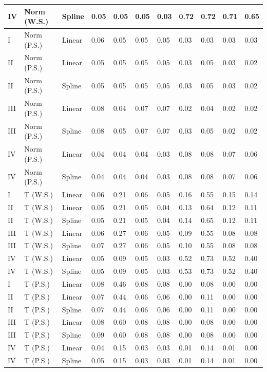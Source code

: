 \documentclass{article}\usepackage[]{graphicx}\usepackage[]{color}
\begin{document}
\begin{table}[ht]
\begin{tabular}{lll|llll|llll}
  IV & Norm (W.S.) & Spline & 0.05 & 0.05 & 0.05 & 0.03 & 0.72 & 0.72 & 0.71 & 0.65 \\ 
   \hline
I & Norm (P.S.) & Linear & 0.06 & 0.05 & 0.05 & 0.05 & 0.03 & 0.03 & 0.03 & 0.03 \\ 
  II & Norm (P.S.) & Linear & 0.05 & 0.05 & 0.05 & 0.05 & 0.03 & 0.05 & 0.03 & 0.02 \\ 
  II & Norm (P.S.) & Spline & 0.05 & 0.05 & 0.05 & 0.05 & 0.03 & 0.05 & 0.03 & 0.02 \\ 
  III & Norm (P.S.) & Linear & 0.08 & 0.04 & 0.07 & 0.07 & 0.02 & 0.04 & 0.02 & 0.02 \\ 
  III & Norm (P.S.) & Spline & 0.08 & 0.05 & 0.07 & 0.07 & 0.03 & 0.05 & 0.02 & 0.02 \\ 
  IV & Norm (P.S.) & Linear & 0.04 & 0.04 & 0.04 & 0.03 & 0.08 & 0.08 & 0.07 & 0.06 \\ 
  IV & Norm (P.S.) & Spline & 0.04 & 0.04 & 0.04 & 0.03 & 0.08 & 0.08 & 0.07 & 0.06 \\ 
   \hline
I & T (W.S.) & Linear & 0.06 & 0.21 & 0.06 & 0.05 & 0.16 & 0.55 & 0.15 & 0.14 \\ 
  II & T (W.S.) & Linear & 0.05 & 0.21 & 0.05 & 0.04 & 0.13 & 0.64 & 0.12 & 0.11 \\ 
  II & T (W.S.) & Spline & 0.05 & 0.21 & 0.05 & 0.04 & 0.14 & 0.65 & 0.12 & 0.11 \\ 
  III & T (W.S.) & Linear & 0.06 & 0.27 & 0.06 & 0.05 & 0.09 & 0.55 & 0.08 & 0.08 \\ 
  III & T (W.S.) & Spline & 0.07 & 0.27 & 0.06 & 0.05 & 0.10 & 0.55 & 0.08 & 0.08 \\ 
  IV & T (W.S.) & Linear & 0.05 & 0.09 & 0.05 & 0.03 & 0.52 & 0.73 & 0.52 & 0.40 \\ 
  IV & T (W.S.) & Spline & 0.05 & 0.09 & 0.05 & 0.03 & 0.53 & 0.73 & 0.52 & 0.40 \\ 
   \hline
I & T (P.S.) & Linear & 0.08 & 0.46 & 0.08 & 0.08 & 0.00 & 0.08 & 0.00 & 0.00 \\ 
  II & T (P.S.) & Linear & 0.07 & 0.44 & 0.06 & 0.06 & 0.00 & 0.11 & 0.00 & 0.00 \\ 
  II & T (P.S.) & Spline & 0.07 & 0.44 & 0.06 & 0.06 & 0.00 & 0.11 & 0.00 & 0.00 \\ 
  III & T (P.S.) & Linear & 0.08 & 0.60 & 0.08 & 0.08 & 0.00 & 0.08 & 0.00 & 0.00 \\ 
  III & T (P.S.) & Spline & 0.09 & 0.60 & 0.08 & 0.08 & 0.00 & 0.08 & 0.00 & 0.00 \\ 
  IV & T (P.S.) & Linear & 0.04 & 0.15 & 0.03 & 0.03 & 0.01 & 0.14 & 0.01 & 0.00 \\ 
  IV & T (P.S.) & Spline & 0.05 & 0.15 & 0.03 & 0.03 & 0.01 & 0.14 & 0.01 & 0.00 \\ 
   \hline
\end{tabular}
\end{table}
\end{document}

